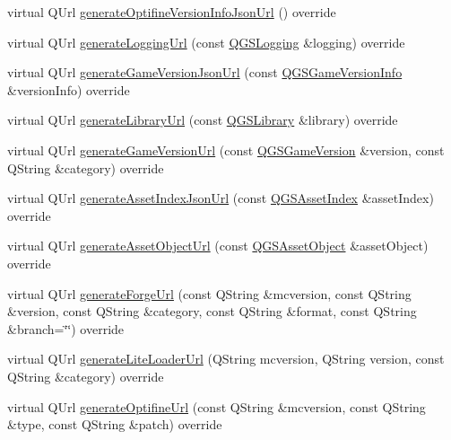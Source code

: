 \begin{DoxyCompactItemize}
virtual Q\+Url \mbox{\hyperlink{class_q_g_s_b_m_c_l_a_p_i_download_source_af14aa10eab10f0842238f924196a9e14}{generate\+Optifine\+Version\+Info\+Json\+Url}} () override
\item 
virtual Q\+Url \mbox{\hyperlink{class_q_g_s_b_m_c_l_a_p_i_download_source_ab33a32509621c2c0d2fef055bcf4cfd5}{generate\+Logging\+Url}} (const \mbox{\hyperlink{class_q_g_s_logging}{Q\+G\+S\+Logging}} \&logging) override
\item 
virtual Q\+Url \mbox{\hyperlink{class_q_g_s_b_m_c_l_a_p_i_download_source_a3d1636cff4806aba1e630e3fea88daa3}{generate\+Game\+Version\+Json\+Url}} (const \mbox{\hyperlink{class_q_g_s_game_version_info}{Q\+G\+S\+Game\+Version\+Info}} \&version\+Info) override
\item 
virtual Q\+Url \mbox{\hyperlink{class_q_g_s_b_m_c_l_a_p_i_download_source_a04a894a9608a9730660e50cb1c80981b}{generate\+Library\+Url}} (const \mbox{\hyperlink{class_q_g_s_library}{Q\+G\+S\+Library}} \&library) override
\item 
virtual Q\+Url \mbox{\hyperlink{class_q_g_s_b_m_c_l_a_p_i_download_source_a40528529f6aee100922aecf731f346bf}{generate\+Game\+Version\+Url}} (const \mbox{\hyperlink{class_q_g_s_game_version}{Q\+G\+S\+Game\+Version}} \&version, const Q\+String \&category) override
\item 
virtual Q\+Url \mbox{\hyperlink{class_q_g_s_b_m_c_l_a_p_i_download_source_a05bfabb12439b0d805bbc0e272cb23df}{generate\+Asset\+Index\+Json\+Url}} (const \mbox{\hyperlink{class_q_g_s_asset_index}{Q\+G\+S\+Asset\+Index}} \&asset\+Index) override
\item 
virtual Q\+Url \mbox{\hyperlink{class_q_g_s_b_m_c_l_a_p_i_download_source_ac1c79d8971173771e2159d839099cf86}{generate\+Asset\+Object\+Url}} (const \mbox{\hyperlink{class_q_g_s_asset_object}{Q\+G\+S\+Asset\+Object}} \&asset\+Object) override
\item 
virtual Q\+Url \mbox{\hyperlink{class_q_g_s_b_m_c_l_a_p_i_download_source_a96abcb4f02ebed7e0c0952f23bef8d00}{generate\+Forge\+Url}} (const Q\+String \&mcversion, const Q\+String \&version, const Q\+String \&category, const Q\+String \&format, const Q\+String \&branch=\char`\"{}\char`\"{}) override
\item 
virtual Q\+Url \mbox{\hyperlink{class_q_g_s_b_m_c_l_a_p_i_download_source_aa6f61651ab57891bc245672c5e184512}{generate\+Lite\+Loader\+Url}} (Q\+String mcversion, Q\+String version, const Q\+String \&category) override
\item 
virtual Q\+Url \mbox{\hyperlink{class_q_g_s_b_m_c_l_a_p_i_download_source_a652a1fccb17bbb957f526d1a5dc03532}{generate\+Optifine\+Url}} (const Q\+String \&mcversion, const Q\+String \&type, const Q\+String \&patch) override
\end{DoxyCompactItemize}



